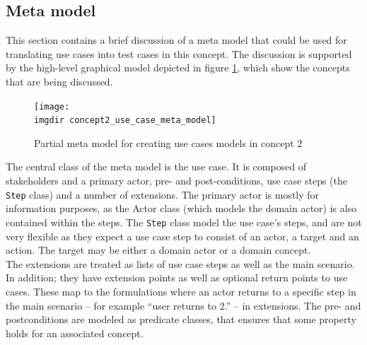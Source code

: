 \subsection{Meta model}
This section contains a brief discussion of a meta model that could be used for translating use cases into test cases in this concept. The discussion is supported by the high-level graphical model depicted in figure \ref{fig:concept2_use_case_meta_model}, which show the concepts that are being discussed.\medskip

\begin{figure}[h]
  \centering
  \texttt{[image: \\imgdir concept2\_use\_case\_meta\_model]}
  \caption{Partial meta model for creating use cases models in concept 2}
  \label{fig:concept2_use_case_meta_model}
\end{figure}

\noindent The central class of the meta model is the use case. It is composed of stakeholders and a primary actor, pre- and post-conditions, use case steps (the \texttt{Step} class) and a number of extensions. The primary actor is mostly for information purposes, as the Actor class (which models the domain actor) is also contained within the steps. The \texttt{Step} class model the use case's steps, and are not very flexible as they expect a use case step to consist of an actor, a target and an action. The target may be either a domain actor or a domain concept.\\
The extensions are treated as lists of use case steps as well as the main scenario. In addition; they have extension points as well as optional return points to use cases. These map to the formulations where an actor returns to a specific step in the main scenario -- for example ``user returns to 2.'' -- in extensions. The pre- and postconditions are modeled as predicate classes, that ensures that some property holds for an associated concept.

